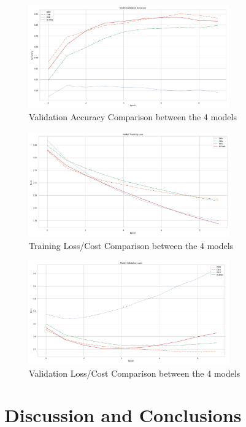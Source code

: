 \documentclass[5p,authoryear]{elsarticle}
\begin{document}
\begin{figure}[!htb] \centering
	\includegraphics[width=3.4in]{figures/All_Val_Acc.png}
	\caption[]{Validation Accuracy Comparison between the 4 models} 
	\label{Val Accuracy} 
\end{figure}

\begin{figure}[!htb] \centering
	\includegraphics[width=3.4in]{figures/All_Train_Loss.png}
	\caption[]{Training Loss/Cost Comparison between the 4 models} 
	\label{Train Loss} 
\end{figure}

\begin{figure}[!htb] \centering
	\includegraphics[width=3.4in]{figures/All_Val_Loss.png}
	\caption[]{Validation Loss/Cost Comparison between the 4 models} 
	\label{Val Loss} 
\end{figure}





\section{Discussion and Conclusions}
\end{document}
